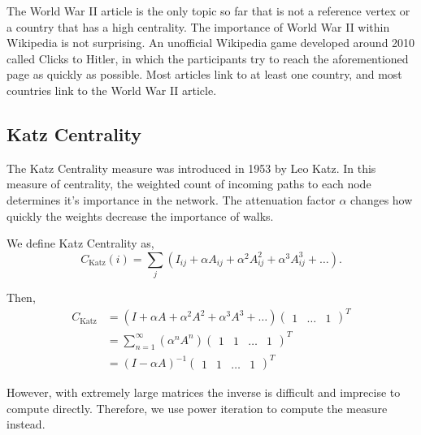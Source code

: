 \documentclass{article}
\begin{document}
The World War II article is the only topic so far that is not a reference vertex or a country that has a high centrality. The importance of World War II within Wikipedia is not surprising. An unofficial Wikipedia game developed around 2010 called Clicks to Hitler, in which the participants try to reach the aforementioned page as quickly as possible.
Most articles link to at least one country, and most countries link to the World War II article.


\subsection{Katz Centrality}

The Katz Centrality measure was introduced in 1953 by Leo Katz. 
In this measure of centrality, the weighted count of incoming paths to each node determines it's importance in the network. The attenuation factor $\alpha$ changes how quickly the weights decrease the importance of walks.

We define Katz Centrality as,
\begin{equation*}
    C_{\textrm{Katz}}(i) = \sum_{j} (I_{ij} + \alpha A_{ij} + \alpha^2 A_{ij}^2 + \alpha^3 A_{ij}^3 + \dots).
\end{equation*}

Then,
\begin{align*}
    C_{\textrm{Katz}} &= (I + \alpha A + \alpha^2 A^2 + \alpha^3 A^3 + \dots) \begin{pmatrix}
        1 & \dots & 1
    \end{pmatrix}^T \\
    &= \sum^\infty_{n=1} (\alpha^n A^n)\begin{pmatrix}
    1 & 1 & \dots & 1
\end{pmatrix}^T \\ 
&= (I - \alpha A)^{-1} \begin{pmatrix}
    1 & 1 & \dots & 1
\end{pmatrix}^T 
\end{align*}

However, with extremely large matrices the inverse is difficult and imprecise to compute directly.
Therefore, we use power iteration to compute the measure instead.
\end{document}
